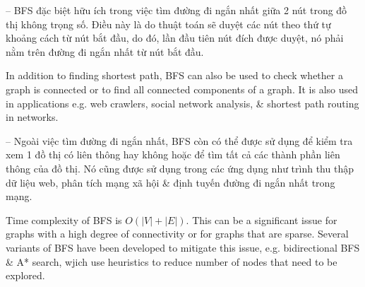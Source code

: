 \documentclass{article}
\begin{document}
\begin{itemize}
\begin{itemize}
\begin{itemize}
            -- BFS đặc biệt hữu ích trong việc tìm đường đi ngắn nhất giữa 2 nút trong đồ thị không trọng số. Điều này là do thuật toán sẽ duyệt các nút theo thứ tự khoảng cách từ nút bắt đầu, do đó, lần đầu tiên nút đích được duyệt, nó phải nằm trên đường đi ngắn nhất từ nút bắt đầu.

            In addition to finding shortest path, BFS can also be used to check whether a graph is connected or to find all connected components of a graph. It is also used in applications e.g. web crawlers, social network analysis, \& shortest path routing in networks.

            -- Ngoài việc tìm đường đi ngắn nhất, BFS còn có thể được sử dụng để kiểm tra xem 1 đồ thị có liên thông hay không hoặc để tìm tất cả các thành phần liên thông của đồ thị. Nó cũng được sử dụng trong các ứng dụng như trình thu thập dữ liệu web, phân tích mạng xã hội \& định tuyến đường đi ngắn nhất trong mạng.

            Time complexity of BFS is $O(|V| + |E|)$. This can be a significant issue for graphs with a high degree of connectivity or for graphs that are sparse. Several variants of BFS have been developed to mitigate this issue, e.g. bidirectional BFS \& A* search, wjich use heuristics to reduce number of nodes that need to be explored.


\end{itemize}
\end{itemize}
\end{itemize}
\end{document}
